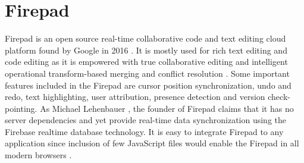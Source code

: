 \section{Firepad}

Firepad is an open source real-time collaborative code and text editing cloud
platform found by Google in 2016 \cite{hid-sp18-409-www-firepad}.  It is mostly
used for rich text editing and code editing as it is empowered with true
collaborative editing and intelligent operational transform-based merging and
conflict resolution \cite{hid-sp18-409-www-firepad-wikipedia}. Some important
features included in the Firepad are cursor position synchronization, undo and
redo, text highlighting, user attribution, presence detection and version
check-pointing. As Michael Lehenbauer \cite{hid-sp18-409-www-firepad}, the
founder of Firepad claims that it has no server dependencies and yet provide
real-time data synchronization using the Firebase realtime database technology.
It is easy to integrate Firepad to any application since inclusion of few
JavaScript files would enable the Firepad in all modern browsers
\cite{hid-sp18-409-www-firepad}.
